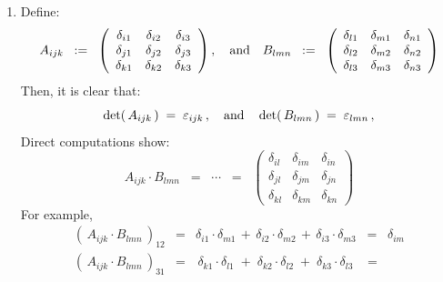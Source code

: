 \begin{enumerate}
\item
    Define:
    \begin{equation*}
    A_{ijk}
    \;\; := \;\;
        \left(\begin{array}{ccc}
        \delta_{i1} & \delta_{i2} & \delta_{i3}
        \\
        \delta_{j1} & \delta_{j2} & \delta_{j3}
        \\
        \delta_{k1} & \delta_{k2} & \delta_{k3}
        \end{array}\right),
    \quad\textnormal{and}\quad
    B_{lmn}
    \;\; := \;\;
        \left(\begin{array}{ccc}
        \delta_{l1} & \delta_{m1} & \delta_{n1}
        \\
        \delta_{l2} & \delta_{m2} & \delta_{n2}
        \\
        \delta_{l3} & \delta_{m3} & \delta_{n3}
        \end{array}\right)
    \end{equation*}
    Then, it is clear that:
    \begin{equation*}
    \det(\,A_{ijk}\,) \; = \;\varepsilon_{ijk}\,,
    \quad\textnormal{and}\quad
    \det(\,B_{lmn}\,) \; = \;\varepsilon_{lmn}\,,
    \end{equation*}
    Direct computations show:
    \begin{equation*}
    A_{ijk} \cdot B_{lmn}
    \;\; = \;\;
        \cdots
    \;\; = \;\;
        \left(\begin{array}{ccc}
        \delta_{il} & \delta_{im} & \delta_{in}
        \\
        \delta_{jl} & \delta_{jm} & \delta_{jn}
        \\
        \delta_{kl} & \delta_{km} & \delta_{kn}
        \end{array}\right)
    \end{equation*}
    For example,
    \begin{eqnarray*}
    \left(\,A_{ijk} \cdot B_{lmn}\,\right)_{12}
    & = &
        \delta_{i1} \cdot \delta_{m1}
        \, + \,
        \delta_{i2} \cdot \delta_{m2}
        \, + \,
        \delta_{i3} \cdot \delta_{m3}
    \;\; = \;\;
        \delta_{im}
    \\
    \left(\,A_{ijk} \cdot B_{lmn}\,\right)_{31}
    & = &
        \,
        \delta_{k1} \cdot \delta_{l1}
        \; + \;
        \delta_{k2} \cdot \delta_{l2}
        \; + \;
        \delta_{k3} \cdot \delta_{l3}
        \;
    \;\; = \;\;

\end{eqnarray*}
\end{enumerate}
